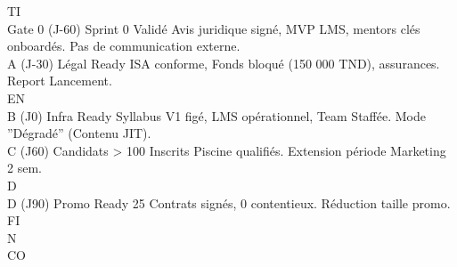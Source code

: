 \documentclass[12pt,landscape,a4paper]{article}
\begin{document}
\vspace{0.5em}
\vspace{0.5em}
\vspace{0.5em}
\vspace{0.5em}
TI\\
Gate 0 (J-60) Sprint 0 Validé Avis juridique signé, MVP LMS, mentors clés onboardés. Pas de communication externe.\\
A (J-30)      Légal Ready     ISA conforme, Fonds bloqué (150 000 TND), assurances. Report Lancement.\\
\vspace{0.5em}
\vspace{0.5em}
\vspace{0.5em}
\vspace{0.5em}
EN\\
B (J0)        Infra Ready     Syllabus V1 figé, LMS opérationnel, Team Staffée.      Mode ”Dégradé” (Contenu JIT).\\
C (J60)       Candidats       \textgreater{} 100 Inscrits Piscine qualifiés.                      Extension période Marketing 2 sem.\\
\vspace{0.5em}
\vspace{0.5em}
\vspace{0.5em}
\vspace{0.5em}
D\\
D (J90)       Promo Ready 25 Contrats signés, 0 contentieux.                         Réduction taille promo.\\
\vspace{0.5em}
\vspace{0.5em}
\vspace{0.5em}
\vspace{0.5em}
FI\\
N\\
CO\\
\end{document}
